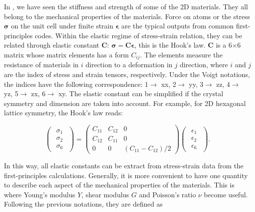 In , we have seen the stiffness and strength of some of the 2D materials. They all belong to the mechanical properties of the materials. Force on atoms or the stress $\boldsymbol{\sigma}$ on the unit cell under finite strain $\boldsymbol{\epsilon}$ are the typical outputs from common first-principles codes. Within the elastic regime of stress-strain relation, they can be related through elastic constant $\boldsymbol{C}$: $\boldsymbol{\sigma}=\boldsymbol{C}\boldsymbol{\epsilon}$, this is the Hook's law. $\boldsymbol{C}$ is a 6$\times$6 matrix whose matrix elements has a form $C_{ij}$. The elements measure the resistance of materials in $i$ direction to a deformation in $j$ direction, where $i$ and $j$ are the index of stress and strain tensors, respectively.  Under the Voigt notations, the indices have the following correspondence: 1$\rightarrow$ xx, 2$\rightarrow$ yy, 3$\rightarrow$ zz, 4$\rightarrow$ yz, 5$\rightarrow$ zx, 6$\rightarrow$ xy. The elastic constant can be simplified if the crystal symmetry and dimension are taken into account. For example, for 2D hexagonal lattice symmetry, the Hook's law reads:

\begin{equation}
\begin{pmatrix} \begin{array}{c} \sigma_1 \\ \sigma_2 \\ \sigma_6 \end{array} 
\end{pmatrix}
=
 \begin{pmatrix}
  C_{11} & C_{12} & 0  \\
  C_{12} & C_{11} & 0  \\
  0 & 0 & (C_{11}-C_{12})/2
 \end{pmatrix}
 \begin{pmatrix} \begin{array}{c} \epsilon_1 \\ \epsilon_2 \\ \epsilon_6 
\end{array} \end{pmatrix}.
\end{equation} 

In this way, all elastic constants can be extract from stress-strain data from the first-principles calculations. Generally, it is more convenient to have one quantity to describe each aspect of the mechanical properties of the materials. This is where Young's modulus $Y$, shear modulus $G$ and Poisson's ratio $\nu$ become useful. Following the previous notations, they are defined as 

